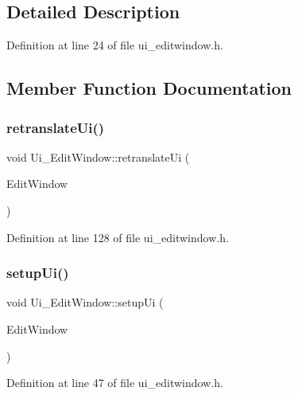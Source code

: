 \subsection{Detailed Description}


Definition at line 24 of file ui\+\_\+editwindow.\+h.



\subsection{Member Function Documentation}
\mbox{\label{class_ui___edit_window_a49415a0f0f9abdd22402b5adb5970a0f}} 
\subsubsection{\texorpdfstring{retranslateUi()}{retranslateUi()}}
{\footnotesize\ttfamily void Ui\+\_\+\+Edit\+Window\+::retranslate\+Ui (\begin{DoxyParamCaption}\item[{Q\+Widget $\ast$}]{Edit\+Window }\end{DoxyParamCaption})\hspace{0.3cm}{\ttfamily [inline]}}



Definition at line 128 of file ui\+\_\+editwindow.\+h.

\mbox{\label{class_ui___edit_window_a73e4228c854ad2e662f738054844fdc3}} 
\subsubsection{\texorpdfstring{setupUi()}{setupUi()}}
{\footnotesize\ttfamily void Ui\+\_\+\+Edit\+Window\+::setup\+Ui (\begin{DoxyParamCaption}\item[{Q\+Widget $\ast$}]{Edit\+Window }\end{DoxyParamCaption})\hspace{0.3cm}{\ttfamily [inline]}}



Definition at line 47 of file ui\+\_\+editwindow.\+h.



